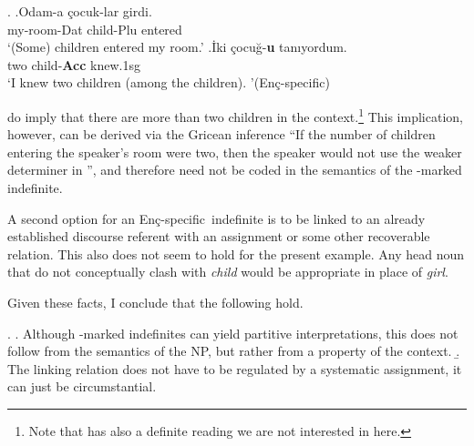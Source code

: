\documentclass[11pt,a4paper]{article}
\newcommand{\encspec}{Enç-specific}
\begin{document}
\ex.\label{exencsamehead}
\ag.\label{exencsameheada}{Odam-a}  {\c{c}ocuk-lar} {girdi.}\\
{my-room-Dat} {child-Plu}  {entered}\\
`(Some) children entered my room.'
\bg.\label{exencsameheadb}İki  çocuğ-\textbf{u} tanıyordum.\\
{two}  {child-{\bf Acc}}  {knew.1sg}\\
`I knew two children (among the children). '\hfill (\encspec)


 do imply that there are more than two
children in the context.\footnote{Note that 
has also a definite reading we are not interested in here.} This
implication, however, can be derived via the Gricean inference ``If
the number of children entering the speaker's room were two, then the
speaker would not use the weaker determiner  in '', and therefore need not be coded in
the semantics of the \acc-marked indefinite.

A second option for an \encspec\ indefinite is to be linked to an
already established discourse referent with an assignment or some
other recoverable relation. This also does not seem to hold for the
present example. Any head noun that do not conceptually clash with
\emph{child} would be appropriate in place of \emph{girl}.

Given these facts, I conclude that the following hold. 

\ex.
\a. Although \acc-marked indefinites can yield partitive
interpretations, this  does not follow from the semantics of the NP,
but rather from a property of the context.
\b. The linking relation does not have to be regulated by a systematic
assignment, it can just be circumstantial.



%
%
%
%
%
%
\end{document}
